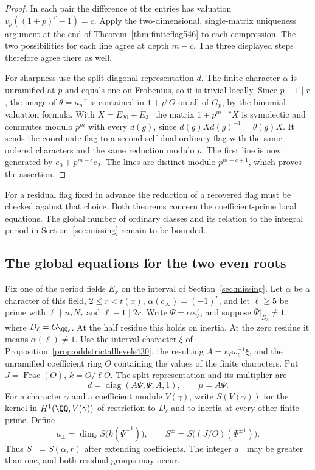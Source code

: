 \documentclass[a4paper,11pt]{article}
\theoremstyle{definition}
\theoremstyle{remark}
\numberwithin{equation}{section}
\begin{document}
\begin{proof}
In each pair the difference of the entries has valuation
\(v_p((1+p)^r-1)=c\). Apply the two-dimensional, single-matrix
uniqueness argument at the end of Theorem~\ref{thm:finiteflag546}
to each compression. The two possibilities for each line
agree at depth \(m-c\). The three displayed steps therefore
agree there as well.

For sharpness use the split diagonal representation \(d\).
The finite character \(\alpha\) is unramified at \(p\) and
equals one on Frobenius, so it is trivial locally. Since
\(p-1\mid r\), the image of \(\theta=\kappa_p^{-r}\)
is contained in \(1+p^cO\) on all of \(G_p\), by the
binomial valuation formula. With \(X=E_{20}+E_{31}\) the
matrix \(1+p^{m-c}X\) is symplectic and commutes modulo
\(p^m\) with every \(d(g)\), since \(d(g)Xd(g)^{-1}=\theta(g)X\).
It sends the coordinate flag to a second self-dual ordinary
flag with the same ordered characters and the same reduction
modulo \(p\). The first line is now generated by
\(e_0+p^{m-c}e_2\). The lines are distinct modulo
\(p^{m-c+1}\), which proves the assertion.
\end{proof}

For a residual flag fixed in advance the reduction of a
recovered flag must be checked against that choice. Both
theorems concern the coefficient-prime local equations.
The global number of ordinary classes and its relation to
the integral period in Section~\ref{sec:missing} remain to
be bounded.


\subsection{The global equations for the two even roots}
\label{sec:generaleven547}

Fix one of the period fields \(E_x\) on the interval of
Section~\ref{sec:missing}. Let \(\alpha\) be a character of this field,
\(2\le r<t(x)\), \(\alpha(c_\infty)=(-1)^r\), and let \(\ell\ge5\)
be prime with \(\ell\nmid n_*N_*\) and \(\ell-1\mid 2r\).
Write \(\Psi=\alpha\kappa_\ell^r\), and suppose
\(\bar\Psi|_{D_\ell}\ne1\), where \(D_\ell=G_{\QQ_\ell}\).
At the half residue this holds on inertia. At the zero residue it
means \(\alpha(\ell)\ne1\). Use the interval character \(\xi\) of
Proposition~\ref{prop:oddstrictalllevels430}, the resulting
\(A=\kappa_\ell\omega_\ell^{-1}\xi\), and the unramified coefficient
ring \(O\) containing the values of the finite characters. Put
\(J=\operatorname{Frac}(O)\), \(k=O/\ell O\). The split
representation and its multiplier are
\[
 d=\operatorname{diag}(A\Psi,\Psi,A,1),\qquad \mu=A\Psi.
\]
For a character \(\gamma\) and a coefficient module \(V(\gamma)\),
write \(S(V(\gamma))\) for the kernel in \(H^1(\QQ,V(\gamma))\)
of restriction to \(D_\ell\) and to inertia at every other finite
prime. Define
\[
 a_\pm=\dim_k S\bigl(k(\bar\Psi^{\pm1})\bigr),\qquad
 S^\pm=S\bigl((J/O)(\Psi^{\pm1})\bigr).
\]
Thus \(S^-=S(\alpha,r)\) after extending coefficients. The integer
\(a_-\) may be greater than one, and both residual groups may occur.
\end{document}
